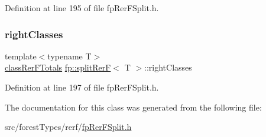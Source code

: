 Definition at line 195 of file fp\+Rer\+F\+Split.\+h.

\mbox{\label{classfp_1_1splitRerF_a8f78d6a0269d046328bead1cbf51be36}} 
\subsubsection{\texorpdfstring{right\+Classes}{rightClasses}}
{\footnotesize\ttfamily template$<$typename T$>$ \\
\hyperlink{classfp_1_1classRerFTotals}{class\+Rer\+F\+Totals} \hyperlink{classfp_1_1splitRerF}{fp\+::split\+RerF}$<$ T $>$\+::right\+Classes\hspace{0.3cm}{\ttfamily [protected]}}



Definition at line 197 of file fp\+Rer\+F\+Split.\+h.



The documentation for this class was generated from the following file\+:\begin{DoxyCompactItemize}
\item 
src/forest\+Types/rerf/\hyperlink{fpRerFSplit_8h}{fp\+Rer\+F\+Split.\+h}\end{DoxyCompactItemize}
